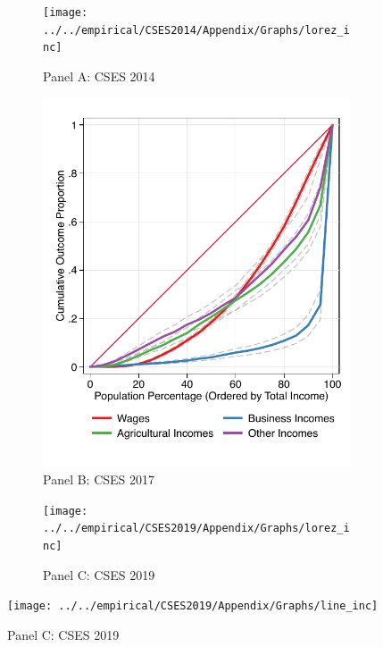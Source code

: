 \documentclass[11pt,letterpaper]{article}
\begin{document}
\begin{figure}
	\caption{Lorenz curve of household income, consumption and assets}
	\label{fig:fig}
	\begin{subfigure}{.33\textwidth}
		\centering
		\caption*{Panel A: CSES 2014}
		\label{fig:sub-first}
		\texttt{[image: ../../empirical/CSES2014/Appendix/Graphs/lorez\_inc]}
		
	\end{subfigure}
	\begin{subfigure}{.33\textwidth}
		\centering
		\caption*{Panel B: CSES 2017}
		\label{fig:sub-second}
		\includegraphics[width=1\linewidth]{../../empirical/CSES2017/Appendix/Graphs/lorez_inc}
		
	\end{subfigure}
	\begin{subfigure}{.33\textwidth}
		\centering
		\caption*{Panel C: CSES 2019}
		\label{fig:sub-first}
		\texttt{[image: ../../empirical/CSES2019/Appendix/Graphs/lorez\_inc]}
		
	\end{subfigure}
	\texttt{[image: ../../empirical/CSES2019/Appendix/Graphs/line\_inc]}
	\vspace{-3em}
	\newline
	

\end{figure}
\end{document}
